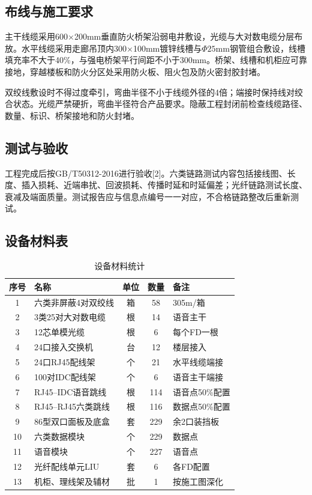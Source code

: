 \documentclass[UTF8,a4paper,12pt]{ctexart}
\begin{document}
\subsection{布线与施工要求}
主干线缆采用600$\times$200mm垂直防火桥架沿弱电井敷设，光缆与大对数电缆分层布放。水平线缆采用走廊吊顶内300$\times$100mm镀锌线槽与$\Phi25$mm钢管组合敷设，线槽填充率不大于40\%，与强电桥架平行间距不小于300mm。桥架、线槽和机柜应可靠接地，穿越楼板和防火分区处采用防火板、阻火包及防火密封胶封堵。

双绞线敷设时不得过度牵引，弯曲半径不小于线缆外径的4倍；端接时保持线对绞合状态。光缆严禁硬折，弯曲半径符合产品要求。隐蔽工程封闭前检查线缆路径、数量、标识、桥架接地和防火封堵。

\subsection{测试与验收}
工程完成后按GB/T50312-2016进行验收[2]。六类链路测试内容包括接线图、长度、插入损耗、近端串扰、回波损耗、传播时延和时延偏差；光纤链路测试长度、衰减及端面质量。测试报告应与信息点编号一一对应，不合格链路整改后重新测试。

\subsection{设备材料表}
\begin{table}[H]
\centering
\caption{设备材料统计}
\small
\begin{tabular}{|c|p{5.1cm}|c|c|p{3.0cm}|}
\hline
序号 & 名称 & 单位 & 数量 & 备注\\ \hline
1 & 六类非屏蔽4对双绞线 & 箱 & 58 & 305m/箱\\
2 & 3类25对大对数电缆 & 根 & 14 & 语音主干\\
3 & 12芯单模光缆 & 根 & 6 & 每个FD一根\\
4 & 24口接入交换机 & 台 & 12 & 楼层接入\\
5 & 24口RJ45配线架 & 个 & 21 & 水平线缆端接\\
6 & 100对IDC配线架 & 个 & 6 & 语音主干端接\\
7 & RJ45--IDC语音跳线 & 根 & 114 & 语音点50\%配置\\
8 & RJ45--RJ45六类跳线 & 根 & 116 & 数据点50\%配置\\
9 & 86型双口面板及底盒 & 套 & 229 & 余2口装挡板\\
10 & 六类数据模块 & 个 & 229 & 数据点\\
11 & 语音模块 & 个 & 227 & 语音点\\
12 & 光纤配线单元LIU & 套 & 6 & 各FD配置\\
13 & 机柜、理线架及辅材 & 批 & 1 & 按施工图深化\\ \hline
\end{tabular}
\end{table}
\end{document}
